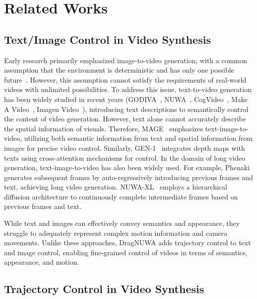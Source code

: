 \documentclass{article} %
\begin{document}
\section{Related Works}

\subsection{Text/Image Control in Video Synthesis}

Early research primarily emphasized image-to-video generation, with a common assumption that the environment is deterministic and has only one possible future~\citet{lotterDeepPredictiveCoding2016,srivastavaUnsupervisedLearningVideo2015,chiappaRecurrentEnvironmentSimulators2016}. However, this assumption cannot satisfy the requirements of real-world videos with unlimited possibilities. To address this issue, text-to-video generation has been widely studied in recent years (GODIVA~\citet{wuGODIVAGeneratingOpenDomaIn2021}, NUWA~\citet{wuUWAVisualSynthesis2022}, CogVideo~\citet{hongCogVideoLargescalePretraining2022}, Make A Video~\citet{singerMakeAVideoTexttoVideoGeneration2022}, Imagen Video~\citet{hoImagenVideoHigh2022}), introducing text descriptions to semantically control the content of video generation. However, text alone cannot accurately describe the spatial information of visuals. Therefore, MAGE~\citet{huMakeItMove2022} emphasizes text-image-to-video, utilizing both semantic information from text and spatial information from images for precise video control. Similarly, GEN-1~\citet{esserStructureContentguidedVideo2023} integrates depth maps with texts using cross-attention mechanisms for control. In the domain of long video generation, text-image-to-video has also been widely used. For example, Phenaki~\citet{villegasPhenakiVariableLength2022} generates subsequent frames by auto-regressively introducing previous frames and text, achieving long video generation. NUWA-XL~\citet{yinNUWAXLDiffusionDiffusion2023} employs a hierarchical diffusion architecture to continuously complete intermediate frames based on previous frames and text.

While text and images can effectively convey semantics and appearance, they struggle to adequately represent complex motion information and camera movements.  Unlike these approaches, DragNUWA adds trajectory control to text and image control, enabling fine-grained control of videos in terms of semantics, appearance, and motion.

\subsection{Trajectory Control in Video Synthesis}
\end{document}
